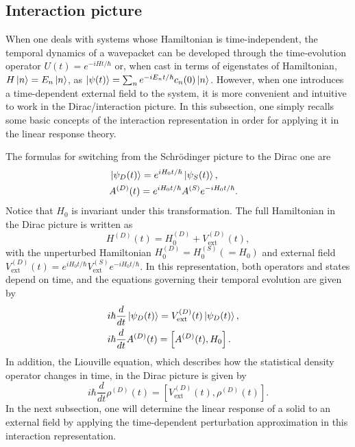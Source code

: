 \documentclass[a4paper,12pts,dvipsnames]{article}
\numberwithin{equation}{section}
\begin{document}
\subsection{Interaction picture}
When one deals with systems whose Hamiltonian is time-independent, the temporal dynamics of a wavepacket can be developed through the time-evolution operator $U(t)=e^{-iHt/\hbar}$ or, when cast in terms of eigenstates of Hamiltonian, $H\ket{n}=E_n\ket{n}$, as $\ket{\psi(t)}=\sum_{n} e^{-iE_nt/\hbar}c_n(0)\ket{n}$. However, when one introduces a time-dependent external field to the system, it is more convenient and intuitive to work in the Dirac/interaction picture. In this subsection, one simply recalls some basic concepts of the interaction representation in order for applying it in the linear response theory.

The formulas for switching from the Schr\"{o}dinger picture to the Dirac one are 
\begin{eqnarray}
	&\ket{\psi_D(t)} = e^{iH_0t/\hbar}\ket{\psi_S(t)},&\\ &A^{(D)}(t)=e^{iH_0t/\hbar}A^{(S)}e^{-iH_0t/\hbar}.&
\end{eqnarray}
Notice that $H_0$ is invariant under this transformation. The full Hamiltonian in the Dirac picture is written as
\begin{equation}
H^{(D)}(t) = H^{(D)}_0 + V^{(D)}_{\text{ext}}(t),
\end{equation}
with the unperturbed Hamiltonian $H^{(D)}_0 = H^{(S)}_0 (= H_0)$ and external field $V^{(D)}_{\text{ext}}(t) = e^{iH_0t/\hbar}V^{(S)}_{\text{ext}}e^{-iH_0t/\hbar}$.
In this representation, both operators and states depend on time, and the equations governing their temporal evolution are given by
\begin{eqnarray}
	&i\hbar\dfrac{d}{dt}\ket{\psi_D(t)} = V_{\text{ext}}^{(D)}(t)\ket{\psi_D(t)},&\\
	&i\hbar\dfrac{d}{dt}A^{(D)}(t) = \left[A^{(D)}(t),H_0\right].&
\end{eqnarray}
In addition, the Liouville equation, which describes how the statistical density operator changes in time, in the Dirac picture is given by
\begin{equation}
	i\hbar\frac{d}{dt}\rho^{(D)}(t) = \left[V^{(D)}_{\text{ext}}(t),\rho^{(D)}(t)\right].
\end{equation}
In the next subsection, one will determine the linear response of a solid to an external field by applying the time-dependent perturbation approximation in this interaction representation.
\end{document}
